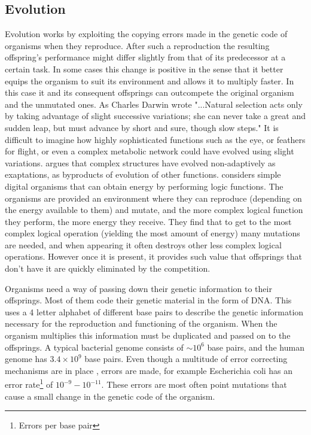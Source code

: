 \documentclass[a4paper,12pt]{article}
\begin{document}
	
	\subsection{Evolution}\label{chap:evolution}
	
	Evolution works by exploiting the copying errors made in the genetic code of organisms when they reproduce. After such a reproduction the resulting offspring's performance might differ slightly from that of its predecessor at a certain task. In some cases this change is positive in the sense that it better equips the organism to suit its environment and allows it to multiply faster. In this case it and its consequent offsprings can outcompete the original organism and the unmutated ones.  As Charles Darwin wrote "...Natural selection acts only by taking advantage of slight successive variations; she can never take a great and sudden leap, but must advance by short and sure, though slow steps." \cite{darwin} 
	It is difficult to imagine how highly sophisticated functions such as the eye, or feathers for flight, or even a complex metabolic network could have evolved using slight variations. \cite{latent} argues that complex structures have evolved non-adaptively as exaptations, as byproducts of evolution of other functions. \cite{complexfeatures}  considers simple digital organisms that can obtain energy by performing logic functions. The organisms are provided an environment where they can reproduce (depending on the energy available to them) and mutate, and the more complex logical function they perform, the more energy they receive. They find that to get to the most complex logical operation (yielding the most amount of energy) many mutations are needed, and when appearing it often destroys other less complex logical operations. However once it is present, it provides such value that offsprings that don't have it are quickly eliminated by the competition. %
	

	Organisms need a way of passing down their genetic information to their offsprings. 
	Most of them code their genetic material in the form of DNA. This uses a 4 letter alphabet of different base pairs to describe the genetic information necessary for the reproduction and functioning of the organism. When the organism multiplies this information must be duplicated and passed on to the offsprings. A typical bacterial genome consists of $\sim 10^6$ base pairs, and the human genome has $3.4 \times 10^9$ base pairs. Even though a multitude of error correcting mechanisms are in place \cite{dnarepair}, errors are made, for example Escherichia coli has an error rate\footnote{Errors per base pair} of $10^{-9} - 10^{-11}$\cite{ecolierrorrate}. These errors are most often point mutations that cause a small change in the genetic code of the organism.
	
\end{document}
